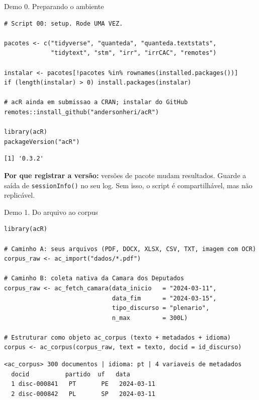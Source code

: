 \documentclass[11pt,aspectratio=169]{beamer}
\begin{document}
\begin{frame}[fragile]{Demo 0. Preparando o ambiente}
\begin{lstlisting}
# Script 00: setup. Rode UMA VEZ.

pacotes <- c("tidyverse", "quanteda", "quanteda.textstats",
             "tidytext", "stm", "irr", "irrCAC", "remotes")

instalar <- pacotes[!pacotes %in% rownames(installed.packages())]
if (length(instalar) > 0) install.packages(instalar)

# acR ainda em submissao a CRAN; instalar do GitHub
remotes::install_github("andersonheri/acR")

library(acR)
packageVersion("acR")
\end{lstlisting}
\begin{lstlisting}[style=Rsaida]
[1] '0.3.2'
\end{lstlisting}
\vspace{0.05cm}
\footnotesize \textbf{Por que registrar a versão:} versões de pacote mudam
resultados. Guarde a saída de \texttt{sessionInfo()} no seu log. Sem isso, o
script é compartilhável, mas não replicável.
\end{frame}

\begin{frame}[fragile]{Demo 1. Do arquivo ao corpus}
\begin{lstlisting}
library(acR)

# Caminho A: seus arquivos (PDF, DOCX, XLSX, CSV, TXT, imagem com OCR)
corpus_raw <- ac_import("dados/*.pdf")

# Caminho B: coleta nativa da Camara dos Deputados
corpus_raw <- ac_fetch_camara(data_inicio   = "2024-03-11",
                              data_fim      = "2024-03-15",
                              tipo_discurso = "plenario",
                              n_max         = 300L)

# Estruturar como objeto ac_corpus (texto + metadados + idioma)
corpus <- ac_corpus(corpus_raw, text = texto, docid = id_discurso)
\end{lstlisting}
\begin{lstlisting}[style=Rsaida]
<ac_corpus> 300 documentos | idioma: pt | 4 variaveis de metadados
  docid          partido  uf   data
  1 disc-000841   PT       PE   2024-03-11
  2 disc-000842   PL       SP   2024-03-11
\end{lstlisting}
\end{frame}
\end{document}
